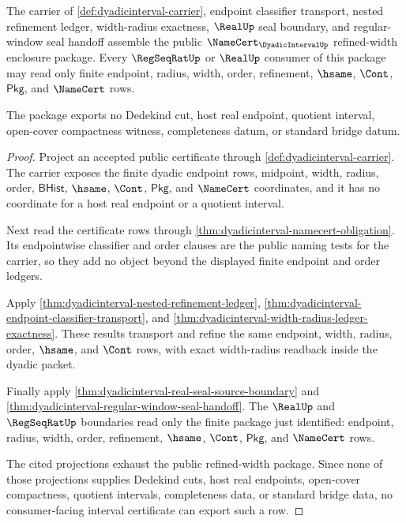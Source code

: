 \begin{theorem}
\label{thm:dyadicinterval-refined-width-enclosure-package}
The carrier of \autoref{def:dyadicinterval-carrier}, endpoint classifier
transport, nested refinement ledger, width-radius exactness, $\RealUp$ seal
boundary, and regular-window seal handoff assemble the public
$\NameCert_{\DyadicIntervalUp}$ refined-width enclosure package. Every
$\RegSeqRatUp$ or $\RealUp$ consumer of this package may read only finite
endpoint, radius, width, order, refinement, $\hsame$, $\Cont$, $\mathsf{Pkg}$,
and $\NameCert$ rows.

The package exports no Dedekind cut, host real endpoint, quotient interval,
open-cover compactness witness, completeness datum, or standard bridge datum.
\end{theorem}
\begin{proof}
Project an accepted public certificate through
\autoref{def:dyadicinterval-carrier}. The carrier exposes the finite dyadic
endpoint rows, midpoint, width, radius, order, $\mathsf{BHist}$, $\hsame$,
$\Cont$, $\mathsf{Pkg}$, and $\NameCert$ coordinates, and it has no coordinate
for a host real endpoint or a quotient interval.

Next read the certificate rows through
\autoref{thm:dyadicinterval-namecert-obligation}. Its endpointwise classifier
and order clauses are the public naming tests for the carrier, so they add no
object beyond the displayed finite endpoint and order ledgers.

Apply \autoref{thm:dyadicinterval-nested-refinement-ledger},
\autoref{thm:dyadicinterval-endpoint-classifier-transport}, and
\autoref{thm:dyadicinterval-width-radius-ledger-exactness}. These results
transport and refine the same endpoint, width, radius, order, $\hsame$, and
$\Cont$ rows, with exact width-radius readback inside the dyadic packet.

Finally apply \autoref{thm:dyadicinterval-real-seal-source-boundary} and
\autoref{thm:dyadicinterval-regular-window-seal-handoff}. The $\RealUp$ and
$\RegSeqRatUp$ boundaries read only the finite package just identified:
endpoint, radius, width, order, refinement, $\hsame$, $\Cont$, $\mathsf{Pkg}$,
and $\NameCert$ rows.

The cited projections exhaust the public refined-width package. Since none of
those projections supplies Dedekind cuts, host real endpoints, open-cover
compactness, quotient intervals, completeness data, or standard bridge data,
no consumer-facing interval certificate can export such a row.
\end{proof}

